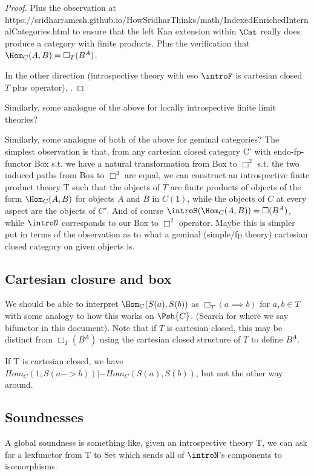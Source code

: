 \begin{proof}
Plus the observation at https://sridharramesh.github.io/HowSridharThinks/math/IndexedEnrichedInternalCategories.html to ensure that the left Kan extension within $\Cat$ really does produce a category with finite products. Plus the verification that $\Hom_C(A, B) = \Box_T (B^A)$.

In the other direction (introspective theory with eso $\introF$ is cartesian closed $T$ plus operator), \TODO.
\end{proof}
Similarly, some analogue of the above for locally introspective finite limit theories? \TODO

\begin{TODOblock}
Similarly, some analogue of both of the above for geminal categories? The simplest observation is that, from any cartesian closed category C' with endo-fp-functor Box s.t. we have a natural transformation from Box to $\Box^2$ s.t. the two induced paths from Box to $\Box^3$ are equal, we can construct an introspective finite product theory T such that the objects of $T$ are finite products of objects of the form $\Hom_C(A, B)$ for objects $A$ and $B$ in $C(1)$, while the objects of $C$ at every aspect are the objects of $C'$. And of course $\introS(\Hom_C(A, B)) = \Box(B^A)$, while $\introN$ corresponds to our Box to $\Box^2$ operator. Maybe this is simpler put in terms of the observation as to what a geminal (simple/fp theory) cartesian closed category on given objects is.
\end{TODOblock}

\subsection{Cartesian closure and box}
We should be able to interpret $\Hom_C(S(a), S(b))$ as $\Box_T(a \implies b)$ for $a, b \in T$ with some analogy to how this works on $\Psh{C}$. (Search for where we say bifunctor in this document). Note that if $T$ is cartesian closed, this may be distinct from $\Box_T (B^A)$ using the cartesian closed structure of $T$ to define $B^A$.

If T is cartesian closed, we have $Hom_C(1, S(a -> b)) |- Hom_C(S(a), S(b))$, but not the other way around.

\subsection{Soundnesses}
\TODO

A global soundness is something like, given an introspective theory T, we can ask for a lexfunctor from T to Set which sends all of $\introN$'s components to isomorphisms.

